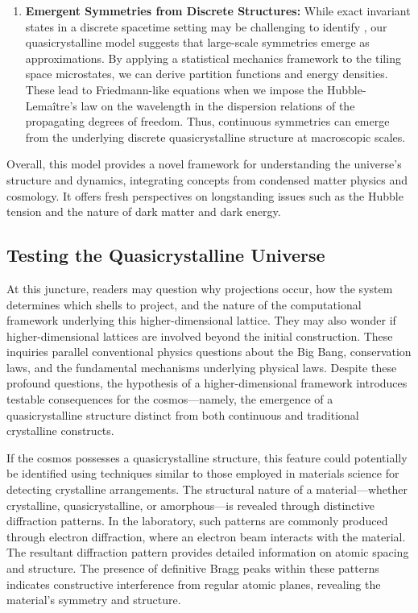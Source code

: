 \documentclass[sn-mathphys-num]{sn-jnl}%
\begin{document}
\begin{enumerate}
\item \textbf{Emergent Symmetries from Discrete Structures:} While exact invariant states in a discrete spacetime setting may be challenging to identify \cite{bojowald}, our quasicrystalline model suggests that large-scale symmetries emerge as approximations. By applying a statistical mechanics framework to the tiling space microstates, we can derive partition functions and energy densities. These lead to Friedmann-like equations when we impose the Hubble-Lemaître's law on the wavelength in the dispersion relations of the propagating degrees of freedom. Thus, continuous symmetries can emerge from the underlying discrete quasicrystalline structure at macroscopic scales.
\end{enumerate}

Overall, this model provides a novel framework for understanding the universe's structure and dynamics, integrating concepts from condensed matter physics and cosmology. It offers fresh perspectives on longstanding issues such as the Hubble tension and the nature of dark matter and dark energy.

\subsection{Testing the Quasicrystalline Universe}

At this juncture, readers may question why projections occur, how the system determines which shells to project, and the nature of the computational framework underlying this higher-dimensional lattice. They may also wonder if higher-dimensional lattices are involved beyond the initial construction. These inquiries parallel conventional physics questions about the Big Bang, conservation laws, and the fundamental mechanisms underlying physical laws. Despite these profound questions, the hypothesis of a higher-dimensional framework introduces testable consequences for the cosmos—namely, the emergence of a quasicrystalline structure distinct from both continuous and traditional crystalline constructs.

If the cosmos possesses a quasicrystalline structure, this feature could potentially be identified using techniques similar to those employed in materials science for detecting crystalline arrangements. The structural nature of a material—whether crystalline, quasicrystalline, or amorphous—is revealed through distinctive diffraction patterns. In the laboratory, such patterns are commonly produced through electron diffraction, where an electron beam interacts with the material. The resultant diffraction pattern provides detailed information on atomic spacing and structure. The presence of definitive Bragg peaks within these patterns indicates constructive interference from regular atomic planes, revealing the material's symmetry and structure.
\end{document}
